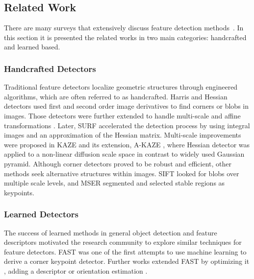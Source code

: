 \subsection{Related Work}
\label{keynet_sec:related_work}

There are many surveys that extensively discuss feature detection methods~\cite{Karel_Vedaldi_BMVC_18, TuytelaarsMikolajczyk2007}. 
In this section it is presented the related works in two main categories: handcrafted and learned based. 


\subsubsection{Handcrafted Detectors}
Traditional feature detectors localize geometric structures through engineered algorithms, which are often referred to as handcrafted. Harris \cite{Harris} and Hessian \cite{Hessian} detectors used first and second order image derivatives to find corners or blobs in images. Those detectors were further extended to handle multi-scale and affine transformations \cite{mikolajczykIJCV2004, comparasionofdetector}. Later, SURF \cite{SURF} accelerated the detection process by using integral images and an approximation of the Hessian matrix. Multi-scale improvements were proposed in KAZE \cite{KAZE} and its extension, A-KAZE \cite{AKAZE}, where Hessian detector was applied to a non-linear diffusion scale space in contrast to widely used Gaussian pyramid. Although corner detectors proved to be robust and efficient, other methods seek alternative structures within images. SIFT \cite{SIFT} looked for blobs over multiple scale levels, and MSER \cite{MSER} segmented and selected stable regions as keypoints.


\subsubsection{Learned Detectors}
The success of learned methods in general object detection and feature descriptors motivated the research community to explore similar techniques for feature detectors. 
FAST \cite{FAST} was one of the first attempts to use machine learning to derive a corner keypoint detector. Further works extended FAST by optimizing it \cite{FASTER}, adding a descriptor \cite{BRISK} or orientation estimation \cite{ORB}.

